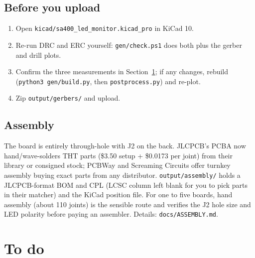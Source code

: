 \documentclass[11pt,a4paper]{article}
\begin{document}
\subsection{Before you upload}
\begin{enumerate}[leftmargin=8mm]
\item Open \texttt{kicad/sa400\_led\_monitor.kicad\_pro} in KiCad 10.
\item Re-run DRC and ERC yourself: \texttt{gen/check.ps1} does both plus the gerber and drill plots.
\item Confirm the three measurements in Section~\ref{sec:todo}; if any changes, rebuild
(\texttt{python3 gen/build.py}, then \texttt{postprocess.py}) and re-plot.
\item Zip \texttt{output/gerbers/} and upload.
\end{enumerate}

\subsection{Assembly}
The board is entirely through-hole with J2 on the back. JLCPCB's PCBA now hand/wave-solders THT parts
(\$3.50 setup + \$0.0173 per joint) from their library or consigned stock; PCBWay and Screaming Circuits
offer turnkey assembly buying exact parts from any distributor. \texttt{output/assembly/} holds a
JLCPCB-format BOM and CPL (LCSC column left blank for you to pick parts in their matcher) and the KiCad
position file. For one to five boards, hand assembly (about 110 joints) is the sensible route and verifies
the J2 hole size and LED polarity before paying an assembler. Details: \texttt{docs/ASSEMBLY.md}.

\section{To do}\label{sec:todo}
\end{document}
